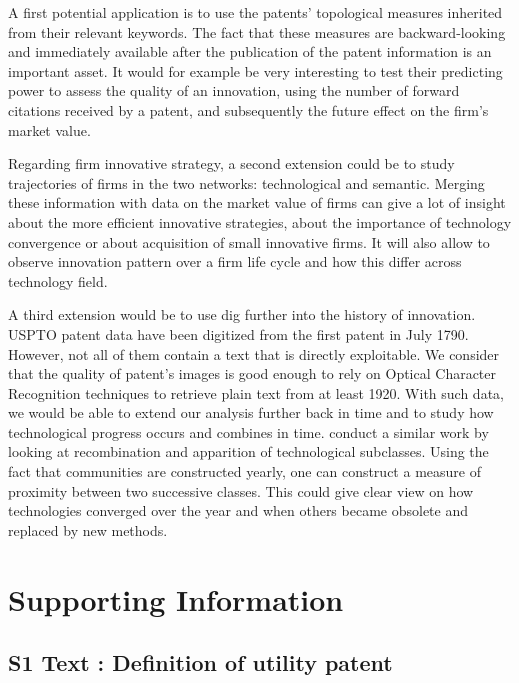 \documentclass[10pt,A4,draft]{article}
\begin{document}
A first potential application is to use the patents' topological measures inherited from their relevant keywords. The fact that these measures are backward-looking and immediately available after the publication of the patent information is an important asset. It would for example be very interesting to test their predicting power to assess the quality of an innovation, using the number of forward citations received by a patent, and subsequently the future effect on the firm's market value. 

Regarding firm innovative strategy, a second extension could be to study trajectories of firms in the two networks: technological and semantic. Merging these information with data on the market value of firms can give a lot of insight about the more efficient innovative strategies, about the importance of technology convergence or about acquisition of small innovative firms. It will also allow to observe innovation pattern over a firm life cycle and how this differ across technology field.


A third extension would be to use dig further into the history of innovation. USPTO patent data have been digitized from the first patent in July 1790. However, not all of them contain a text that is directly exploitable. We consider that the quality of patent's images is good enough to rely on Optical Character Recognition techniques to retrieve plain text from at least 1920. With such data, we would be able to extend our analysis further back in time and to study how technological progress occurs and combines in time. \cite{akcigit2013mechanics} conduct a similar work by looking at recombination and apparition of technological subclasses.
Using the fact that communities are constructed yearly, one can construct a measure of proximity between two successive classes. This could give clear view on how technologies converged over the year and when others became obsolete and replaced by new methods.










\section*{Supporting Information \label{sectionSI}}

\subsection*{S1 Text : Definition of utility patent}
\end{document}
